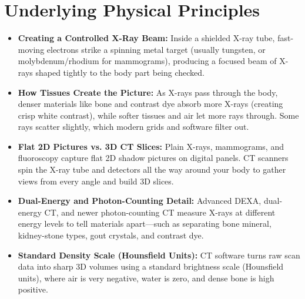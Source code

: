 \section{Underlying Physical Principles}
\begin{itemize}
  \item \textbf{Creating a Controlled X-Ray Beam:} Inside a shielded X-ray tube, fast-moving electrons strike a spinning metal target (usually tungsten, or molybdenum/rhodium for mammograms), producing a focused beam of X-rays shaped tightly to the body part being checked.
  \item \textbf{How Tissues Create the Picture:} As X-rays pass through the body, denser materials like bone and contrast dye absorb more X-rays (creating crisp white contrast), while softer tissues and air let more rays through. Some rays scatter slightly, which modern grids and software filter out.
  \item \textbf{Flat 2D Pictures vs. 3D CT Slices:} Plain X-rays, mammograms, and fluoroscopy capture flat 2D shadow pictures on digital panels. CT scanners spin the X-ray tube and detectors all the way around your body to gather views from every angle and build 3D slices.
  \item \textbf{Dual-Energy and Photon-Counting Detail:} Advanced DEXA, dual-energy CT, and newer photon-counting CT measure X-rays at different energy levels to tell materials apart---such as separating bone mineral, kidney-stone types, gout crystals, and contrast dye.
  \item \textbf{Standard Density Scale (Hounsfield Units):} CT software turns raw scan data into sharp 3D volumes using a standard brightness scale (Hounsfield units), where air is very negative, water is zero, and dense bone is high positive.
\end{itemize}

